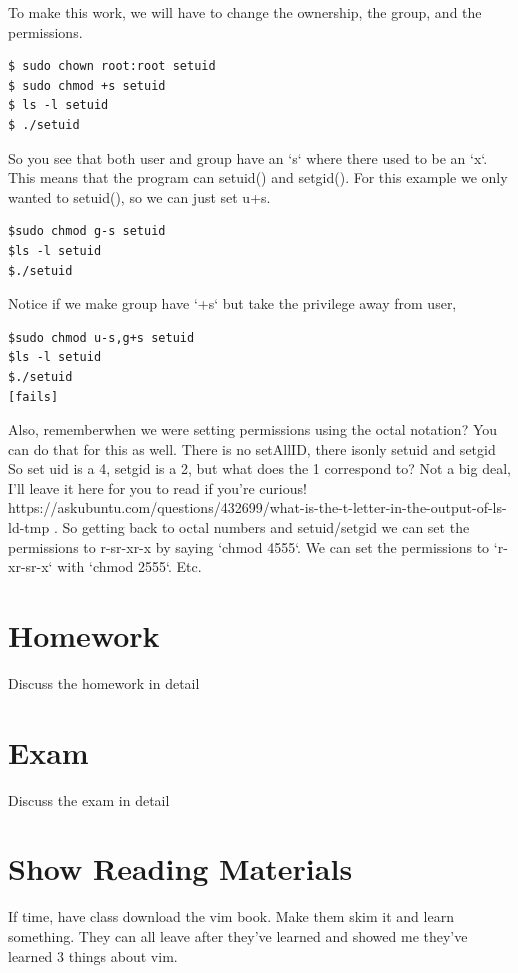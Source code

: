 \documentclass[12pt]{article}
\begin{document}
To make this work, we will have to change the ownership, the group, and the permissions.

\begin{lstlisting}
$ sudo chown root:root setuid
$ sudo chmod +s setuid
$ ls -l setuid
$ ./setuid
\end{lstlisting}

So you see that both user and group have an `s` where there used to be an `x`. This means that the program can setuid() and setgid(). For this example we only wanted to setuid(), so we can just set u+s.

\begin{lstlisting}
$sudo chmod g-s setuid
$ls -l setuid
$./setuid
\end{lstlisting}

Notice if we make group have `+s` but take the privilege away from user, 

\begin{lstlisting}
$sudo chmod u-s,g+s setuid
$ls -l setuid
$./setuid
[fails]
\end{lstlisting}

Also, rememberwhen we were setting permissions using the octal notation? You can do that for this as well. There is no setAllID, there isonly setuid and setgid
So set uid is a 4, setgid is a 2, but what does the 1 correspond to? Not a big deal, I'll leave it here for you to read if you're curious! https://askubuntu.com/questions/432699/what-is-the-t-letter-in-the-output-of-ls-ld-tmp . So getting back to octal numbers and setuid/setgid we can set the permissions to r-sr-xr-x by saying `chmod 4555`. We can set the permissions to `r-xr-sr-x` with `chmod 2555`. Etc.

\section{Homework}
Discuss the homework in detail

\section{Exam}
Discuss the exam in detail

\section{Show Reading Materials}
If time, have class  download the vim book. Make them skim it and learn something. They can all leave after they've learned and showed me they've learned 3 things about vim.
\end{document}
